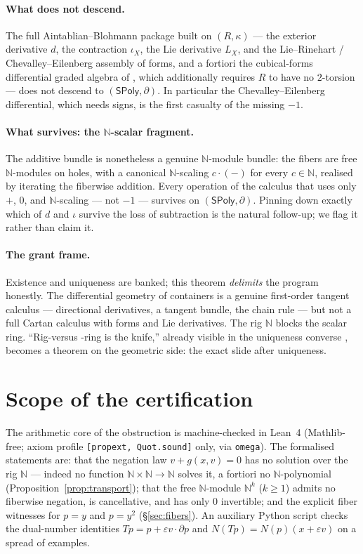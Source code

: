 \documentclass[11pt]{article}
\theoremstyle{definition}
\newcommand{\SPoly}{\mathsf{SPoly}}
\newcommand{\N}{\mathbb{N}}
\begin{document}
\paragraph{What does not descend.}
The full Aintablian--Blohmann package built on $(R,\kappa)$ --- the exterior derivative
$d$, the contraction $\iota_X$, the Lie derivative $L_X$, and the
Lie--Rinehart / Chevalley--Eilenberg assembly of forms, and a fortiori the cubical-forms
differential graded algebra of \cite{AintablianBlohmann2026b}, which additionally requires
$R$ to have no $2$-torsion --- does not descend to $(\SPoly,\partial)$. In particular the
Chevalley--Eilenberg differential, which needs signs, is the first casualty of the missing
$-1$.

\paragraph{What survives: the $\N$-scalar fragment.}
The additive bundle is nonetheless a genuine $\N$-module bundle: the fibers are free
$\N$-modules on holes, with a canonical $\N$-scaling $c\cdot(-)$ for every $c\in\N$,
realised by iterating the fiberwise addition. Every operation of the calculus that uses
only $+$, $0$, and $\N$-scaling --- not $-1$ --- survives on $(\SPoly,\partial)$. Pinning
down exactly which of $d$ and $\iota$ survive the loss of subtraction is the natural
follow-up; we flag it rather than claim it.

\paragraph{The grant frame.}
Existence and uniqueness are banked; this theorem \emph{delimits} the program honestly. The
differential geometry of containers is a genuine first-order tangent calculus ---
directional derivatives, a tangent bundle, the chain rule --- but not a full Cartan
calculus with forms and Lie derivatives. The rig $\N$ blocks the scalar ring. ``Rig-versus
-ring is the knife,'' already visible in the uniqueness converse
\cite{MacBethUniqueness}, becomes a theorem on the geometric side: the exact slide after
uniqueness.

\section{Scope of the certification}\label{sec:lean}

The arithmetic core of the obstruction is machine-checked in Lean~4 (Mathlib-free; axiom
profile \texttt{[propext, Quot.sound]} only, via \texttt{omega}). The formalised statements
are: that the negation law $v+g(x,v)=0$ has no solution over the rig $\N$ --- indeed no
function $\N\times\N\to\N$ solves it, a fortiori no $\N$-polynomial
(Proposition~\ref{prop:transport}); that the free $\N$-module $\N^k$ ($k\ge1$) admits no
fiberwise negation, is cancellative, and has only $0$ invertible; and the explicit fiber
witnesses for $p=y$ and $p=y^2$ (\S\ref{sec:fibers}). An auxiliary Python script checks the
dual-number identities $Tp=p+\varepsilon v\cdot\partial p$ and
$N(Tp)=N(p)(x+\varepsilon v)$ on a spread of examples.
\end{document}
